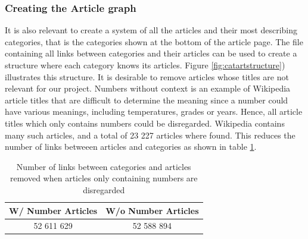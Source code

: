 \subsubsection{Creating the Article graph}
It is also relevant to create a system of all the articles and their most describing categories, that is the categories shown at the bottom of the article page. The file containing all links between categories and their articles can be used to create a structure where each category knows its articles. Figure \ref{fig:catartstructure}) illustrates this structure. It is desirable to remove articles whose titles are not relevant for our project. Numbers without context is an example of Wikipedia article titles that are difficult to determine the meaning since a number could have various meanings, including temperatures, grades or years. Hence, all article titles which only contains numbers could be disregarded. Wikipedia contains many such articles, and a total of 23 227 articles where found. This reduces the number of links betweeen articles and categories as shown in table  \ref{tab:withoutnumber}.

\begin{table}[h]
\centering
\begin{tabular}{c|c}
\textbf{W/ Number Articles} & \textbf{W/o Number Articles}  \\ \hline
52 611 629 & 52 588 894
\end{tabular}
\caption[Number of links without number articles]{Number of links between categories and articles removed when articles only containing numbers are disregarded}
\label{tab:withoutnumber}
\end{table}


